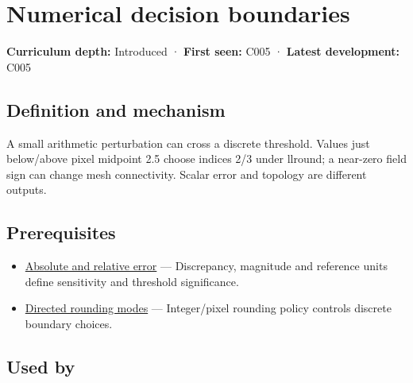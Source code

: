 \hypertarget{appendix-c80db39080be}{}\label{referencestart:appendix-c80db39080be}
\section{Numerical decision boundaries}\label{appendix-c80db39080be-numerical-decision-boundaries}

\hypertarget{appendix-c80db39080be-numerical-decision-boundaries}{}

\textbf{Curriculum depth:} Introduced · \textbf{First seen:} C005 · \textbf{Latest development:} C005

\begin{allmightroledefinition}

\subsection{Definition and mechanism}\label{appendix-c80db39080be-definition-and-mechanism}

\hypertarget{appendix-c80db39080be-definition-and-mechanism}{}

A small arithmetic perturbation can cross a discrete threshold. Values just below/above pixel midpoint 2.5 choose indices 2/3 under llround; a near-zero field sign can change mesh connectivity. Scalar error and topology are different outputs.

\end{allmightroledefinition}

\subsection{Prerequisites}\label{appendix-c80db39080be-prerequisites}

\hypertarget{appendix-c80db39080be-prerequisites}{}

\begin{itemize}
\tightlist
\item
  \hyperref[appendix-3ae74e89b4e6]{Absolute and relative error} --- Discrepancy, magnitude and reference units define sensitivity and threshold significance.
\item
  \hyperref[appendix-637d164ae5ca]{Directed rounding modes} --- Integer/pixel rounding policy controls discrete boundary choices.
\end{itemize}

\subsection{Used by}\label{appendix-c80db39080be-used-by}

